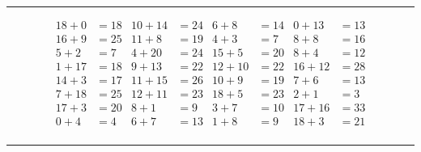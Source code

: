 \documentclass{article}
\begin{document}
\begin{sloppy}
\hrule
\begin{align*}
    {18} + {0} &= {18} & {10} + {14} &= {24} & {6} + {8} &= {14} & {0} + {13} &= {13} \\
    {16} + {9} &= {25} & {11} + {8} &= {19} & {4} + {3} &= {7} & {8} + {8} &= {16} \\
    {5} + {2} &= {7} & {4} + {20} &= {24} & {15} + {5} &= {20} & {8} + {4} &= {12} \\
    {1} + {17} &= {18} & {9} + {13} &= {22} & {12} + {10} &= {22} & {16} + {12} &= {28} \\
    {14} + {3} &= {17} & {11} + {15} &= {26} & {10} + {9} &= {19} & {7} + {6} &= {13} \\
    {7} + {18} &= {25} & {12} + {11} &= {23} & {18} + {5} &= {23} & {2} + {1} &= {3} \\
    {17} + {3} &= {20} & {8} + {1} &= {9} & {3} + {7} &= {10} & {17} + {16} &= {33} \\
    {0} + {4} &= {4} & {6} + {7} &= {13} & {1} + {8} &= {9} & {18} + {3} &= {21} \\
\end{align*}
\hrule
\end{sloppy}
\end{document}
